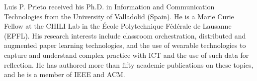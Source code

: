 \documentclass[10pt,journal,compsoc]{IEEEtran}
\begin{document}
%
%
%
%


\begin{IEEEbiography}{Luis P. Prieto} received his Ph.D. in Information and Communication Technologies from the University of Valladolid (Spain). He is a Marie Curie Fellow at the CHILI Lab in the \'Ecole Polytechnique F\'ed\'erale de Lausanne (EPFL). His research interests include classroom orchestration, distributed and augmented paper learning technologies, and the use of wearable technologies to capture and understand complex practice with ICT and the use of such data for reflection. He has authored more than fifty academic publications on these topics, and he is a member of IEEE and ACM.
\end{IEEEbiography}
\end{document}
